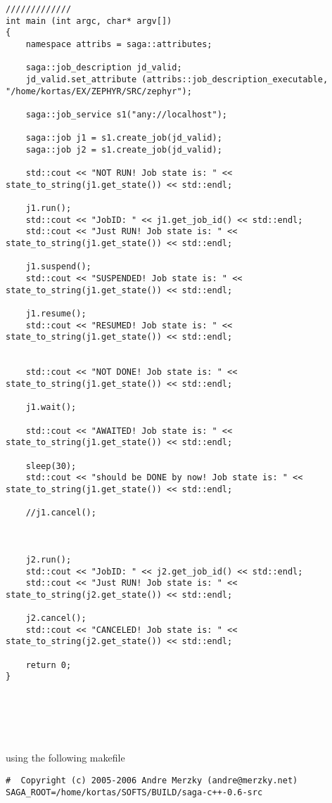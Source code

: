 \begin{enumerate}
\begin{lstlisting}
/////////////
int main (int argc, char* argv[])
{
    namespace attribs = saga::attributes;
    
    saga::job_description jd_valid;
    jd_valid.set_attribute (attribs::job_description_executable,  "/home/kortas/EX/ZEPHYR/SRC/zephyr");
    
    saga::job_service s1("any://localhost");
    
    saga::job j1 = s1.create_job(jd_valid);
    saga::job j2 = s1.create_job(jd_valid);

    std::cout << "NOT RUN! Job state is: " << state_to_string(j1.get_state()) << std::endl;

    j1.run();
    std::cout << "JobID: " << j1.get_job_id() << std::endl;
    std::cout << "Just RUN! Job state is: " << state_to_string(j1.get_state()) << std::endl;

    j1.suspend();
    std::cout << "SUSPENDED! Job state is: " << state_to_string(j1.get_state()) << std::endl;
    
    j1.resume();
    std::cout << "RESUMED! Job state is: " << state_to_string(j1.get_state()) << std::endl;
        
    
    std::cout << "NOT DONE! Job state is: " << state_to_string(j1.get_state()) << std::endl;
    
    j1.wait();

    std::cout << "AWAITED! Job state is: " << state_to_string(j1.get_state()) << std::endl;
    
    sleep(30);
    std::cout << "should be DONE by now! Job state is: " << state_to_string(j1.get_state()) << std::endl;

    //j1.cancel();
    


    j2.run();
    std::cout << "JobID: " << j2.get_job_id() << std::endl;
    std::cout << "Just RUN! Job state is: " << state_to_string(j2.get_state()) << std::endl;

    j2.cancel();
    std::cout << "CANCELED! Job state is: " << state_to_string(j2.get_state()) << std::endl;

    return 0;
}






\end{lstlisting}

using the following makefile
\begin{lstlisting}
#  Copyright (c) 2005-2006 Andre Merzky (andre@merzky.net)
SAGA_ROOT=/home/kortas/SOFTS/BUILD/saga-c++-0.6-src


\end{lstlisting}
\end{enumerate}
